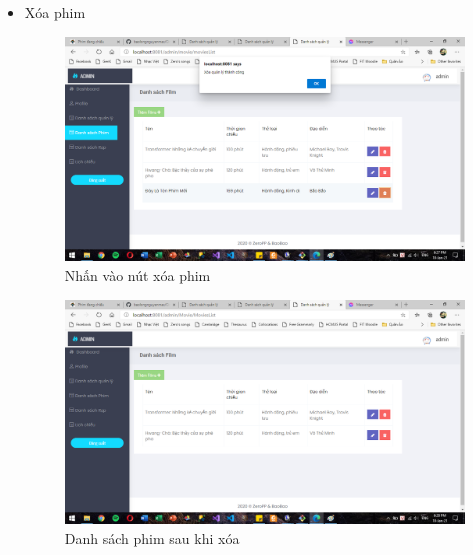 \documentclass[a4paper, 12pt]{article}
\begin{document}
\begin{itemize}
\begin{itemize}
		\item Xóa phim
			\begin{figure}[H]
				\begin{center}
					\includegraphics[scale=0.5]{./image/demo_managerDelMovie1.png}
					\caption{Nhấn vào nút xóa phim}
				\end{center}
			\end{figure}
	
			\begin{figure}[H]
				\begin{center}
					\includegraphics[scale=0.5]{./image/demo_managerDelMovie2.png}
					\caption{Danh sách phim sau khi xóa}
				\end{center}
			\end{figure}


\end{itemize}
\end{itemize}
\end{document}

